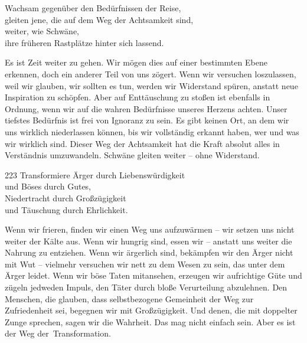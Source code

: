 
\begin{dhpVerse}{91}
\label{dhp-91}
Wachsam gegenüber den Bedürfnissen der Reise,\\ 
gleiten jene, die auf dem Weg der Achtsamkeit sind,\\
weiter, wie Schwäne,\\
ihre früheren Rastplätze hinter sich lassend. 
\end{dhpVerse}

\begin{dhpRefl}

Es ist Zeit weiter zu gehen. Wir mögen dies auf einer bestimmten Ebene
erkennen, doch ein anderer Teil von uns zögert. Wenn wir versuchen
loszulassen, weil wir glauben, wir sollten es tun, werden wir Widerstand
spüren, anstatt neue Inspiration zu schöpfen. Aber auf Enttäuschung zu stoßen
ist ebenfalls in Ordnung, wenn wir auf die wahren Bedürfnisse unseres Herzens
achten. Unser tiefstes Bedürfnis ist frei von Ignoranz zu sein. Es gibt keinen
Ort, an dem wir uns wirklich niederlassen können, bis wir vollständig erkannt
haben, wer und was wir wirklich sind. Dieser Weg der Achtsamkeit hat die Kraft
absolut alles in Verständnis umzuwandeln. Schwäne gleiten weiter -- ohne
Widerstand.

\end{dhpRefl}


\begin{dhpVerse}{223}
\label{dhp-223}
Transformiere Ärger durch Liebenswürdigkeit\\ 
und Böses durch Gutes,\\ 
Niedertracht durch Großzügigkeit\\ 
und Täuschung durch Ehrlichkeit.
\end{dhpVerse}

\begin{dhpRefl}

Wenn wir frieren, finden wir einen Weg uns aufzuwärmen -- wir setzen uns nicht
weiter der Kälte aus. Wenn wir hungrig sind, essen wir -- anstatt uns weiter
die Nahrung zu entziehen. Wenn wir ärgerlich sind, bekämpfen wir den Ärger
nicht mit Wut -- vielmehr versuchen wir nett zu dem Wesen zu sein, das unter
dem Ärger leidet. Wenn wir böse Taten mitansehen, erzeugen wir aufrichtige
Güte und zügeln jedweden Impuls, den Täter durch bloße Verurteilung
abzulehnen. Den Menschen, die glauben, dass selbstbezogene Gemeinheit der Weg
zur Zufriedenheit sei, begegnen wir mit Großzügigkeit. Und denen, die mit
doppelter Zunge sprechen, sagen wir die Wahrheit. Das mag nicht einfach sein.
Aber es ist der Weg der~Transformation.

\end{dhpRefl}

